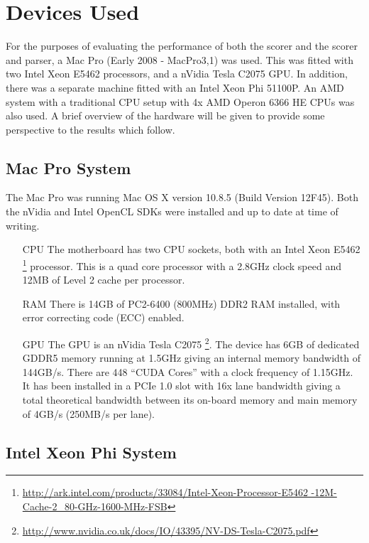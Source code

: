 \section{Devices Used}

For the purposes of evaluating the performance of both the scorer and the scorer
and parser, a Mac Pro (Early 2008 - MacPro3,1) was used. This was fitted with
two Intel Xeon E5462 processors, and a nVidia Tesla C2075 GPU. In addition,
there was a separate machine fitted with an Intel Xeon Phi 51100P. An AMD system
with a traditional CPU setup with 4x AMD Operon 6366 HE CPUs was also used. A
brief overview of the hardware will be given to provide some perspective to the
results which follow.

\subsection{Mac Pro System}

The Mac Pro was running Mac OS X version 10.8.5 (Build Version 12F45). Both the
nVidia and Intel OpenCL SDKs were installed and up to date at time of writing.

\begin{itemize}

\item[CPU] The motherboard has two CPU sockets, both with an Intel Xeon E5462
\footnote{\url{http://ark.intel.com/products/33084/Intel-Xeon-Processor-E5462
-12M-Cache-2_80-GHz-1600-MHz-FSB}} processor. This is a quad core processor with
a 2.8GHz clock speed and 12MB of Level 2 cache per processor.

\item[RAM] There is 14GB of PC2-6400 (800MHz) DDR2 RAM installed, with error
correcting code (ECC) enabled.

\item[GPU] The GPU is an nVidia Tesla C2075
\footnote{\url{http://www.nvidia.co.uk/docs/IO/43395/NV-DS-Tesla-C2075.pdf}}.
The device has 6GB of dedicated GDDR5 memory running at 1.5GHz giving an
internal memory bandwidth of 144GB/s. There are 448 ``CUDA Cores'' with a clock
frequency of 1.15GHz. It has been installed in a PCIe 1.0 slot with 16x lane
bandwidth giving a total theoretical bandwidth between its on-board memory and
main memory of 4GB/s (250MB/s per lane).

\end{itemize}

\subsection{Intel Xeon Phi System}

